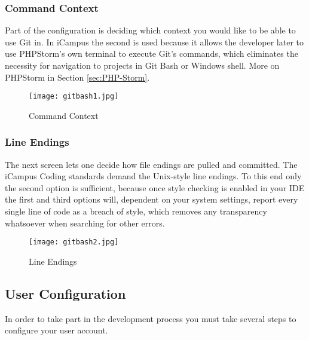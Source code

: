 \subsubsection{Command Context}
Part of the configuration is deciding which context you would like to be able to use Git in. In iCampus the second is used because it allows the developer later to use PHPStorm's own terminal to execute Git's commands, which eliminates the necessity for navigation to projects in Git Bash or Windows shell. More on PHPStorm in Section \ref{sec:PHP-Storm}.\\

\begin{figure}[h] 
	\centering
	\texttt{[image: gitbash1.jpg]}
	\caption{Command Context}
\end{figure}

\subsubsection{Line Endings}

The next screen lets one decide how file endings are pulled and committed. The iCampus Coding standards demand the Unix-style line endings. To this end only the second option is sufficient, because once style checking is enabled in your IDE the first and third options will, dependent on your system settings, report every single line of code as a breach of style, which removes any transparency whatsoever when searching for other errors.\\

\begin{figure}[h] 
	\centering
	\texttt{[image: gitbash2.jpg]}
	\caption{Line Endings}
\end{figure}

\subsection{User Configuration}

In order to take part in the development process you must take several steps to configure your user account.

